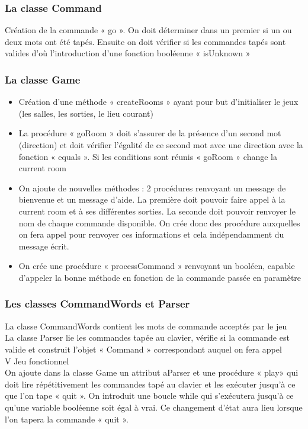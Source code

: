 \documentclass[twoside,french]{report}
\begin{document}
\subsubsection*{La classe Command}
Création de la commande « go ». On doit déterminer dans un premier si un ou deux mots ont été tapés. Ensuite on doit vérifier si les commandes tapés sont valides d’où  l’introduction d’une fonction booléenne « isUnknown »
\subsubsection*{La classe Game}
\begin{itemize}
\item Création d’une méthode « createRooms » ayant pour but d’initialiser le jeux (les salles, les sorties, le lieu courant)
\item La procédure « goRoom » doit s’assurer de la présence d’un second mot (direction) et doit vérifier l’égalité de ce second mot avec une direction avec la fonction « equals ». Si les conditions sont réunis « goRoom » change la current room
\item On ajoute de nouvelles méthodes : 2 procédures renvoyant un message de bienvenue et un message d’aide. La première doit pouvoir faire appel à la current room et à ses différentes sorties. La seconde doit pouvoir renvoyer le nom de chaque commande disponible. On crée donc des procédure auxquelles on fera appel pour renvoyer ces informations et cela indépendamment du message écrit.
\item On crée une procédure « processCommand » renvoyant un booléen, capable d’appeler la bonne méthode en fonction de la commande passée en paramètre
\end{itemize}

\subsubsection*{Les classes CommandWords et Parser}
La classe CommandWords contient les mots de commande acceptés par le jeu\\
La classe Parser lie les commandes tapée au clavier, vérifie si la commande est valide et construit l’objet « Command » correspondant auquel on fera appel\\
V Jeu fonctionnel\\
On ajoute dans la classe Game un attribut aParser et une procédure « play» qui doit lire répétitivement les commandes tapé au clavier et les exécuter jusqu’à ce que l’on tape « quit ». On introduit une boucle while qui s’exécutera jusqu’à ce qu’une variable booléenne soit égal à vrai. Ce changement d’état aura lieu lorsque l’on tapera la commande « quit ».\\   
\end{document}
